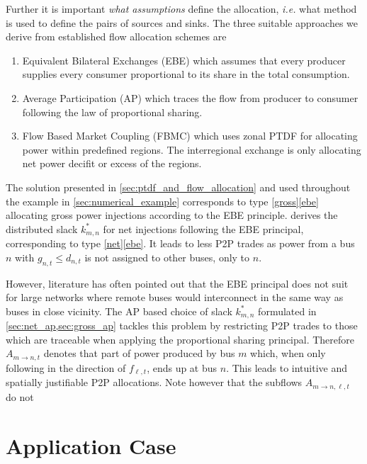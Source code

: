 \documentclass[11pt,twocolumn]{article}
\newcommand{\ie}{\textit{i.e.} }
\newcommand{\nodalgeneration}[1][n]{g_{#1,t}}
\newcommand{\nodaldemand}[1][n]{d_{#1,t}}
\newcommand{\Slackk}{k^*_{m,n}}
\newcommand{\flow}{f_{\ell,t}}
\newcommand{\allocatePeer}[1][m \rightarrow n]{A_{#1,t}}
\newcommand{\allocateTransaction}[1][m \rightarrow n]{A_{#1,\ell,t}}
\begin{document}
Further it is important \textit{what assumptions} define the allocation, \ie what method is used to define the pairs of sources and sinks. The three suitable approaches we derive from established flow allocation schemes are
\begin{enumerate}[label=\alph*., ref=\alph*]
\item Equivalent Bilateral Exchanges (EBE) \cite{galiana_transmission_2003} which assumes
that every producer supplies every consumer proportional to its share in the total consumption. \label{ebe} 
\item Average Participation (AP) \cite{bialek_tracing_1996,achayuthakan_electricity_2010-1} which traces the flow from producer to consumer following the law of proportional sharing. \label{ap}
\item Flow Based Market Coupling (FBMC) which uses zonal PTDF for allocating power within predefined regions. The interregional exchange is only allocating net power decifit or excess of the regions. \label{fbmc}
\end{enumerate}

The solution presented in \cref{sec:ptdf_and_flow_allocation} and used throughout the example in \cref{sec:numerical_example} corresponds to type \ref{gross}\ref{ebe} allocating gross power injections according to the EBE principle.  derives the distributed slack $\Slackk$ for net injections following the EBE principal, corresponding to type \ref{net}\ref{ebe}. It leads to less P2P trades as power from a bus $n$ with $\nodalgeneration \le \nodaldemand$ is not assigned to other buses, only to $n$. 

However, literature has often pointed out that the EBE principal does not suit for large networks where remote buses would interconnect in the same way as buses in close vicinity\cite{gil_multiarea_2005}. The AP based choice of slack $\Slackk$ formulated in \cref{sec:net_ap,sec:gross_ap} tackles this problem by restricting P2P trades to those which are traceable when applying the proportional sharing principal. Therefore $\allocatePeer$ denotes that part of power produced by bus $m$ which, when only following in the direction of $\flow$, ends up at bus $n$. This leads to intuitive and spatially justifiable P2P allocations. Note however that the subflows $\allocateTransaction$ do not 


\section{Application Case}
\end{document}
